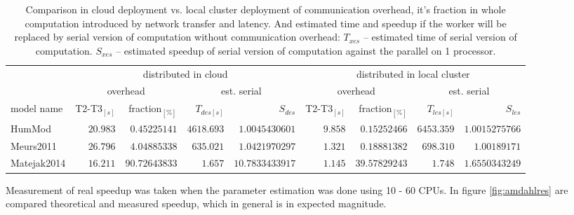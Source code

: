 \begin{table}[ht]
\footnotesize
\begin{tabular}{|l|r|r|r|r|r|r|r|r|}
\hline
& \multicolumn{4}{c|}{distributed in cloud} & \multicolumn{4}{c|}{distributed in local cluster} \\
 & \multicolumn{2}{c|}{overhead} & \multicolumn{2}{c|}{est. serial} & \multicolumn{2}{c|}{overhead} & \multicolumn{2}{c|}{est. serial} \\
model name & T2-T3$_{[s]}$ & fraction$_{[\%]}$ & $T_{des [s]}$ & $S_{des}$ & T2-T3$_{[s]}$ & fraction$_{[\%]}$ & $T_{les [s]}$ & $S_{les}$\\
\hline
HumMod \cite{Kofranek2011hummod} & $\num{20.983}$ & $\num{0.45225141}$ & $\num{4618.693}$ & $\num{1.0045430601}$ & $\num{9.858}$ & $\num{0.15252466}$ & $\num{6453.359}$ & $\num{1.0015275766}$ \\
Meurs2011 \cite{Meurs2011} & $\num{26.796}$ & $\num{4.04885338}$ & $\num{635.021}$ & $\num{1.0421970297}$ & $\num{1.321}$ &  $\num{0.18881382}$ & $\num{698.310}$ &$\num{1.00189171}$\\
Matejak2014\cite{Matejak2014sj} & $\num{16.211}$ & $\num{90.72643833}$ & $\num{1.657}$ & $\num{10.7833433917}$ & $\num{1.145}$ &  $\num{39.57829243}$ & $\num{1.748}$ &$\num{1.6550343249}$\\
\hline
\end{tabular}
\caption{ Comparison in cloud deployment vs. local cluster deployment of communication overhead, it's fraction in whole computation introduced by network transfer and latency. And estimated time and speedup if the worker will be replaced by serial version of computation without communication overhead: $T_{xes}$ -- estimated time of serial version of computation. $S_{xes}$ -- estimated speedup of serial version of computation against the parallel on 1 processor.}
\label{table:overhead}
\end{table}

Measurement of real speedup was taken when the parameter estimation was done using 10 - 60 CPUs. In figure \ref{fig:amdahlres} are compared theoretical and measured speedup, which in general is in expected magnitude.

